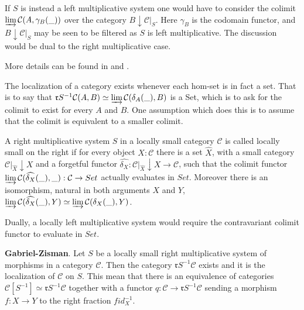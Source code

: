     If $S$ is instead a left multiplicative system one would have to consider the colimit $\varinjlim \mathcal{C}(A,\gamma_B(\_))$ over the category $B\downarrow \mathcal{C}|_{S}$. Here $\gamma_B$ is the codomain functor, and $B\downarrow \mathcal{C}|_{S}$ may be seen to be filtered as $S$ is left multiplicative. The discussion would be dual to the right multiplicative case.
 
     More details can be found in \cite{zisman} and \cite{weibel}.

    The localization of a category exists whenever each hom-set is in fact a set. That is to say that $\mathfrak{r}S^{-1}\mathcal{C}(A,B)\simeq\varinjlim\mathcal{C}(\delta_A(\_),B)$ is a Set, which is to ask for the colimit to exist for every $A$ and $B$. One assumption which does this is to assume that the colimit is equivalent to a smaller colimit.

    \begin{definition}
        A right multiplicative system $S$ in a locally small category $\mathcal{C}$ is called locally small on the right if for every object $X:\mathcal{C}$ there is a set $\widehat{X}$, with a small category $\mathcal{C}|_{\widehat{X}}\downarrow X$ and a forgetful functor $\widehat{\delta_X} : \mathcal{C}|_{\widehat{X}}\downarrow X \rightarrow \mathcal{C}$, such that the colimit functor $\varinjlim\mathcal{C}(\widehat{\delta_X}(\_),\_) : \mathcal{C} \rightarrow Set$ actually evaluates in $Set$. Moreover there is an isomorphism, natural in both arguments $X$ and $Y$, $\varinjlim\mathcal{C}(\widehat{\delta_X}(\_),Y)\simeq\varinjlim\mathcal{C}(\delta_X(\_),Y)$.

        Dually, a locally left multiplicative system would require the contravariant colimit functor to evaluate in $Set$.
    \end{definition}

    \begin{theorem}
        \textbf{Gabriel-Zisman}. Let $S$ be a locally small right multiplicative system of morphisms in a category $\mathcal{C}$. Then the category $\mathfrak{r}S^{-1}\mathcal{C}$ exists and it is the localization of $\mathcal{C}$ on $S$. This mean that there is an equivalence of categories $\mathcal{C}[S^{-1}]\simeq\mathfrak{r}S^{-1}\mathcal{C}$ together with a functor $q: \mathcal{C}\rightarrow\mathfrak{r}S^{-1}\mathcal{C}$ sending a morphism $f : X\rightarrow Y$ to the right fraction $fid_X^{-1}$.
    \end{theorem}

